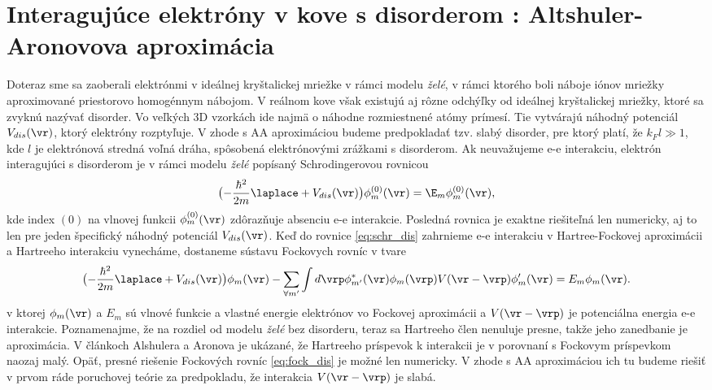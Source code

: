 \section
{Interagujúce elektróny v kove s disorderom : Altshuler-Aronovova aproximácia}
 
 Doteraz sme sa zaoberali elektrónmi v ideálnej kryštalickej mriežke v rámci modelu {\it želé}, v rámci ktorého boli náboje iónov mriežky aproximované
 priestorovo homogénnym nábojom. V reálnom kove však existujú aj rôzne odchýľky od ideálnej kryštalickej mriežky, ktoré sa zvyknú nazývať disorder. Vo veľkých 3D vzorkách
 ide najmä o náhodne rozmiestnené atómy prímesí. Tie vytvárajú náhodný potenciál $V_{dis}(\vr)$, ktorý elektróny rozptyľuje. V zhode s AA aproximáciou budeme predpokladať tzv. slabý disorder, pre ktorý
 platí, že $k_F l \gg 1$, kde $l$ je elektrónová stredná voľná dráha, spôsobená elektrónovými zrážkami s disorderom. 
Ak neuvažujeme e-e interakciu, elektrón interagujúci s disorderom je v rámci modelu {\it želé} popísaný Schrodingerovou rovnicou
\begin{equation}
\label{eq:schr_dis}
\bigl(-\frac{\hbar^2}{2m}\laplace + V_{dis}(\vr)\bigr)\phi_m^{(0)}(\vr)=\E_m\phi_m^{(0)}(\vr) \text{,}
\end{equation}
kde index $(0)$ na vlnovej funkcii $\phi_m^{(0)}(\vr)$ zdôrazňuje absenciu e-e interakcie. Posledná rovnica je exaktne riešiteľná len numericky, aj to len pre jeden špecifický náhodný potenciál  $V_{dis}(\vr)$.
Keď do rovnice \eqref{eq:schr_dis} zahrnieme e-e interakciu v Hartree-Fockovej aproximácii a Hartreeho interakciu vynecháme, dostaneme sústavu Fockovych rovníc v tvare
\begin{equation}
 \label{eq:fock_dis}
 \bigl(-\frac{\hbar^2}{2m}\laplace + V_{dis}(\vr) \bigr)\phi_m(\vr)-\sum_{\forall m'} \int d\vrp \phi^*_{m'}(\vr)\phi_{m}(\vrp)V(\vr-\vrp)\phi_m'(\vr)=E_m\phi_m(\vr) \text{.}
\end{equation}
v ktorej $\phi_m(\vr)$ a $E_m$ sú vlnové funkcie a vlastné energie elektrónov vo Fockovej aproximácii a $V(\vr-\vrp)$ je potenciálna energia e-e interakcie. Poznamenajme, že na rozdiel od modelu {\it želé} bez disorderu, teraz sa Hartreeho člen
nenuluje presne, takže jeho zanedbanie je aproximácia. V článkoch Alshulera a Aronova je ukázané, že Hartreeho príspevok k interakcii je v porovnaní s Fockovym príspevkom naozaj malý.
Opäť, presné riešenie Fockových rovníc \eqref{eq:fock_dis} je možné len numericky. V zhode s AA aproximáciou ich tu budeme riešiť v prvom ráde poruchovej teórie za predpokladu, že 
interakcia $V(\vr-\vrp)$ je slabá. 

